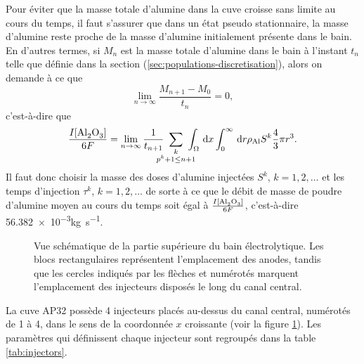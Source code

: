Pour éviter que la masse totale d'alumine dans la cuve croisse sans
limite au cours du temps, il faut s'assurer que dans un état pseudo
stationnaire, la masse d'alumine reste proche de la masse d'alumine
initialement présente dans le bain. En d'autres termes, si $M_n$ est
la masse totale d'alumine dans le bain à l'instant $t_n$ telle que
définie dans la section (\ref{sec:populations-discretisation}), alors
on demande à ce que
\begin{equation*}
\lim_{n\to\infty} \frac{M_{n+1} - M_{0}}{t_n} = 0,
\end{equation*}
c'est-à-dire que
\begin{equation}\label{eq:injection-mass-condition}
  \frac{I[\cee{Al2O3}]}{6F}
  =\lim_{n\to \infty}\frac{1}{t_{n+1}}\ \sum_{\mathclap{\substack{k\\ p^k + 1\leq n +
        1}}}\ \int_\Omega\intd{x}\int_0^\infty\intd{r}\aluminadensity S^k \frac{4}{3}\pi r^3.
\end{equation}
Il faut donc choisir la masse des doses d'alumine injectées $S^k$, $k
= 1, 2,\dots$ et les temps d'injection $\tau^k$, $k = 1,2,\dots$ de
sorte à ce que le débit de masse de poudre d'alumine moyen au cours du
temps soit égal à $\frac{I[\cee{Al2O3}]}{6F}$, c'est-à-dire
\num{56.382e-3}\si{\kilo\gram\per\second}.

\begin{figure}
  \begin{center}
    
    \caption{Vue schématique de la partie supérieure du bain
      électrolytique. Les blocs rectangulaires représentent
      l'emplacement des anodes, tandis que les cercles indiqués par
      les flèches et numérotés marquent l'emplacement des injecteurs
      disposés le long du canal central.}
    \label{fig:anode-configuration}
  \end{center}
\end{figure}

La cuve AP32 possède 4 injecteurs placés au-dessus du canal central,
numérotés de 1 à 4, dans le sens de la coordonnée $x$ croissante (voir
la figure \ref{fig:anode-configuration}). Les paramètres qui
définissent chaque injecteur sont regroupés dans la table
\ref{tab:injectors}.

